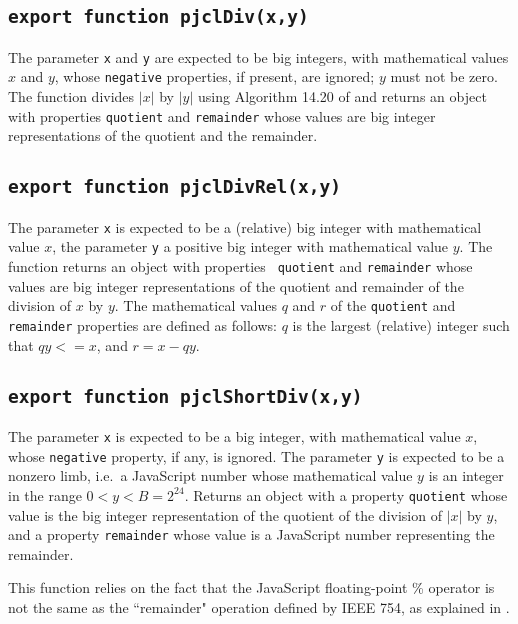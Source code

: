 \documentclass[12pt]{article}
\begin{document}
\subsection{\tt export function pjclDiv(x,y)}

The parameter {\tt x} and {\tt y} are expected to be big integers, with
mathematical values $x$ and $y$, whose {\tt negative} properties, if present, are
ignored; $y$ must not be zero.  The function divides $|x|$ by $|y|$ 
using Algorithm 14.20 of \cite{Menezes97handbookof} and returns an object with
properties {\tt quotient} and {\tt remainder} whose values are big
integer representations of the quotient and the remainder.

\subsection{\tt export function pjclDivRel(x,y)}

The parameter {\tt x} is expected to be a (relative) big integer with
mathematical value $x$, the parameter {\tt y} a positive big integer
with mathematical value $y$.  The function returns an object with properties {\tt
  quotient} and {\tt remainder} whose values are big integer
representations of the quotient and remainder of the division of $x$
by $y$.  The mathematical values $q$ and $r$ of the {\tt quotient} and
{\tt remainder} properties are defined as follows: $q$ is
the largest (relative) integer such that $qy <= x$, and $r = x - qy$.

\subsection{\tt export function pjclShortDiv(x,y)}

The parameter {\tt x} is expected to be a big integer, with
mathematical value $x$, whose {\tt negative} property, if any, is ignored.  The parameter {\tt y}
is expected to be a nonzero limb, i.e.\ a JavaScript number
whose mathematical value $y$ is an integer in the range $0 < y < B = 2^{24}$.  Returns an object
with a property {\tt quotient} whose value is the big integer
representation of the quotient of the division of $|x|$ by $y$, and a
property {\tt remainder} whose value is a JavaScript number representing the remainder.

This function relies on the fact that the JavaScript floating-point \% operator is not the same as the ``remainder" operation defined by IEEE 754, as explained in \cite[\S11.5.3]{ecmascript51}.
\end{document}
